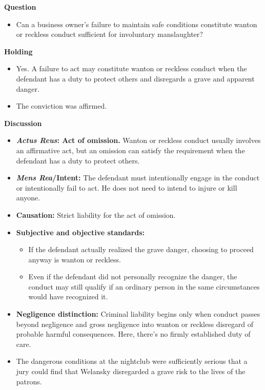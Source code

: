 \documentclass[11pt]{tex/lawoutline}
\begin{document}
{        \textbf{Question}
        \begin{itemize}
            \item Can a business owner's failure to maintain safe conditions constitute wanton or reckless conduct sufficient for involuntary manslaughter?
        \end{itemize}

        \textbf{Holding}
        \begin{itemize}
            \item Yes. A failure to act may constitute wanton or reckless conduct when the defendant has a duty to protect others and disregards a grave and apparent danger.
            \item The conviction was affirmed.
        \end{itemize}

        \textbf{Discussion}
        \begin{itemize}
            \item \textbf{\textit{Actus Reus}: Act of omission.} Wanton or reckless conduct usually involves an affirmative act, but an omission can satisfy the requirement when the defendant has a duty to protect others.
            \item \textbf{\textit{Mens Rea}/Intent:} The defendant must intentionally engage in the conduct or intentionally fail to act. He does not need to intend to injure or kill anyone.
            \item \textbf{Causation:} Strict liability for the act of omission.
            \item \textbf{Subjective and objective standards:}
            \begin{itemize}
                \item If the defendant actually realized the grave danger, choosing to proceed anyway is wanton or reckless.
                \item Even if the defendant did not personally recognize the danger, the conduct may still qualify if an ordinary person in the same circumstances would have recognized it.
            \end{itemize}
            \item \textbf{Negligence distinction:} Criminal liability begins only when conduct passes beyond negligence and gross negligence into wanton or reckless disregard of probable harmful consequences. Here, there's no firmly established duty of care. 
            \item The dangerous conditions at the nightclub were sufficiently serious that a jury could find that Welansky disregarded a grave risk to the lives of the patrons.
        \end{itemize}
    }
\end{document}
